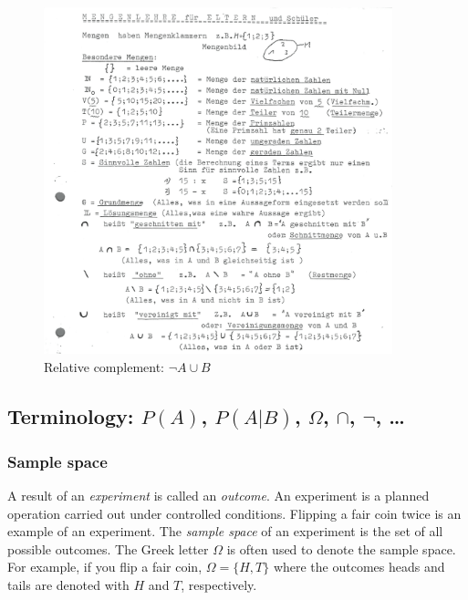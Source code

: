 \documentclass[
  12pt,
  oneside]{book}
\theoremstyle{definition}
\theoremstyle{definition}
\theoremstyle{definition}
\theoremstyle{definition}
\theoremstyle{remark}
\begin{document}
\begin{figure}
\centering
\includegraphics[width=0.9\textwidth,height=\textheight]{fig/mengenlehre-5.png}
\caption{\label{fig:inschool} Relative complement: \(\neg A \cup B\)}
\end{figure}

\subsection{\texorpdfstring{Terminology: \(P(A)\), \(P(A|B)\), \(\Omega\), \(\cap\), \(\neg\), \ldots{}}{Terminology: P(A), P(A\textbar B), \textbackslash Omega, \textbackslash cap, \textbackslash neg, \ldots{}}}\label{terminology-pa-pab-omega-cap-neg}

\subsubsection{Sample space}\label{sample-space}

A result of an \emph{experiment} is called an \emph{outcome}. An experiment is a planned operation carried out under controlled conditions. Flipping a fair coin twice is an example of an experiment.
The \emph{sample space} of an experiment is the set of all possible outcomes.
The Greek letter \(\Omega\) is often used to denote the sample space. For example, if you flip a fair coin, \(\Omega = \{H, T\}\) where the outcomes heads and tails are denoted with \(H\) and \(T\), respectively.
\end{document}
